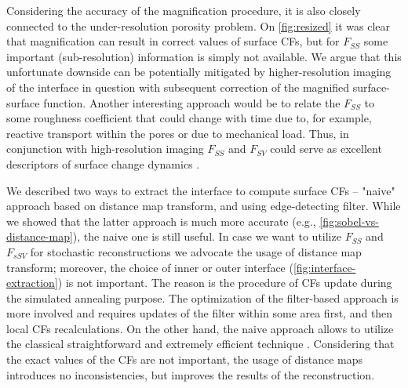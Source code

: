 \documentclass[reprint,amsmath,amssymb,aps,pre,showkeys,showpacs]{revtex4-1}
\begin{document}
Considering the accuracy of the magnification procedure, it is also closely
connected to the under-resolution porosity problem. On \cref{fig:resized}
it was clear that magnification can result in correct values of surface CFs, but
for $F_{SS}$ some important (sub-resolution) information is simply not
available. We argue that this unfortunate downside can be potentially mitigated
by higher-resolution imaging of the interface in question with subsequent
correction of the magnified surface-surface function. Another interesting
approach would be to relate the $F_{SS}$ to some roughness coefficient that
could change with time due to, for example, reactive transport within the pores
\cite{godinho2016,noiriel2021,prokhorov2022} or due to mechanical load. Thus, in
conjunction with high-resolution imaging $F_{SS}$ and $F_{SV}$ could serve as
excellent descriptors of surface change dynamics \cite{chen2022}.

We described two ways to extract the interface to compute surface CFs -- "naive"
approach based on distance map transform, and using edge-detecting filter. While
we showed that the latter approach is much more accurate (e.g.,
\cref{fig:sobel-vs-distance-map}), the naive one is still useful. In case we
want to utilize $F_{SS}$ and $F_{sSV}$ for stochastic reconstructions
\cite{Y-T,JiaoPNAS,karsaninaPRL} we advocate the usage of distance map
transform; moreover, the choice of inner or outer interface
(\cref{fig:interface-extraction}) is not important. The reason is the procedure
of CFs update during the simulated annealing purpose. The optimization of the
filter-based approach is more involved and requires updates of the filter within
some area first, and then local CFs recalculations. On the other hand, the naive
approach allows to utilize the classical straightforward and extremely efficient
technique \cite{rozman2001}. Considering that the exact values of the CFs are
not important, the usage of distance maps introduces no inconsistencies, but
improves the results of the reconstruction.
\end{document}
